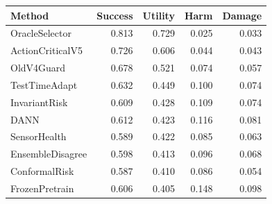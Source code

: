 \begin{tabular}{lrrrr}
\toprule
Method & Success & Utility & Harm & Damage \\
\midrule
OracleSelector & 0.813 & 0.729 & 0.025 & 0.033 \\
ActionCriticalV5 & 0.726 & 0.606 & 0.044 & 0.043 \\
OldV4Guard & 0.678 & 0.521 & 0.074 & 0.057 \\
TestTimeAdapt & 0.632 & 0.449 & 0.100 & 0.074 \\
InvariantRisk & 0.609 & 0.428 & 0.109 & 0.074 \\
DANN & 0.612 & 0.423 & 0.116 & 0.081 \\
SensorHealth & 0.589 & 0.422 & 0.085 & 0.063 \\
EnsembleDisagree & 0.598 & 0.413 & 0.096 & 0.068 \\
ConformalRisk & 0.587 & 0.410 & 0.086 & 0.054 \\
FrozenPretrain & 0.606 & 0.405 & 0.148 & 0.098 \\
\bottomrule
\end{tabular}